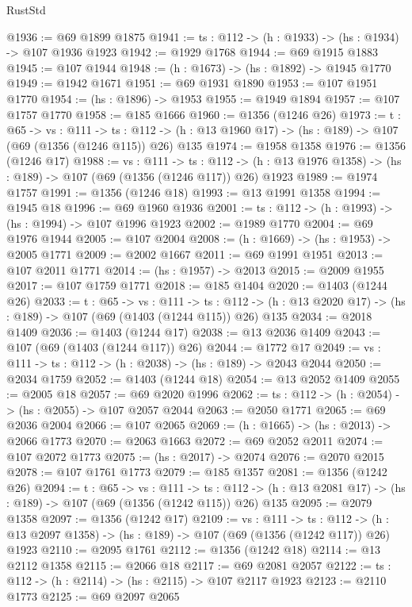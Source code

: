 \begin{lexlean}{RustStd}
\begin{coremodule}
@1936 := @69 @1899 @1875
@1941 := {ts : @112} -> (h : @1933) -> (hs : @1934) -> @107 @1936 @1923
@1942 := @1929 @1768
@1944 := @69 @1915 @1883
@1945 := @107 @1944
@1948 := (h : @1673) -> (hs : @1892) -> @1945 @1770
@1949 := @1942 @1671
@1951 := @69 @1931 @1890
@1953 := @107 @1951 @1770
@1954 := (hs : @1896) -> @1953
@1955 := @1949 @1894
@1957 := @107 @1757 @1770
@1958 := @185 @1666
@1960 := @1356 (@1246 @26)
@1973 := {t : @65} ->
  {vs : @111} ->
  {ts : @112} -> (h : @13 @1960 @17) -> (hs : @189) -> @107 (@69 (@1356 (@1246 @115)) @26) @135
@1974 := @1958 @1358
@1976 := @1356 (@1246 @17)
@1988 := {vs : @111} ->
  {ts : @112} -> (h : @13 @1976 @1358) -> (hs : @189) -> @107 (@69 (@1356 (@1246 @117)) @26) @1923
@1989 := @1974 @1757
@1991 := @1356 (@1246 @18)
@1993 := @13 @1991 @1358
@1994 := @1945 @18
@1996 := @69 @1960 @1936
@2001 := {ts : @112} -> (h : @1993) -> (hs : @1994) -> @107 @1996 @1923
@2002 := @1989 @1770
@2004 := @69 @1976 @1944
@2005 := @107 @2004
@2008 := (h : @1669) -> (hs : @1953) -> @2005 @1771
@2009 := @2002 @1667
@2011 := @69 @1991 @1951
@2013 := @107 @2011 @1771
@2014 := (hs : @1957) -> @2013
@2015 := @2009 @1955
@2017 := @107 @1759 @1771
@2018 := @185 @1404
@2020 := @1403 (@1244 @26)
@2033 := {t : @65} ->
  {vs : @111} ->
  {ts : @112} -> (h : @13 @2020 @17) -> (hs : @189) -> @107 (@69 (@1403 (@1244 @115)) @26) @135
@2034 := @2018 @1409
@2036 := @1403 (@1244 @17)
@2038 := @13 @2036 @1409
@2043 := @107 (@69 (@1403 (@1244 @117)) @26)
@2044 := @1772 @17
@2049 := {vs : @111} -> {ts : @112} -> (h : @2038) -> (hs : @189) -> @2043 @2044
@2050 := @2034 @1759
@2052 := @1403 (@1244 @18)
@2054 := @13 @2052 @1409
@2055 := @2005 @18
@2057 := @69 @2020 @1996
@2062 := {ts : @112} -> (h : @2054) -> (hs : @2055) -> @107 @2057 @2044
@2063 := @2050 @1771
@2065 := @69 @2036 @2004
@2066 := @107 @2065
@2069 := (h : @1665) -> (hs : @2013) -> @2066 @1773
@2070 := @2063 @1663
@2072 := @69 @2052 @2011
@2074 := @107 @2072 @1773
@2075 := (hs : @2017) -> @2074
@2076 := @2070 @2015
@2078 := @107 @1761 @1773
@2079 := @185 @1357
@2081 := @1356 (@1242 @26)
@2094 := {t : @65} ->
  {vs : @111} ->
  {ts : @112} -> (h : @13 @2081 @17) -> (hs : @189) -> @107 (@69 (@1356 (@1242 @115)) @26) @135
@2095 := @2079 @1358
@2097 := @1356 (@1242 @17)
@2109 := {vs : @111} ->
  {ts : @112} -> (h : @13 @2097 @1358) -> (hs : @189) -> @107 (@69 (@1356 (@1242 @117)) @26) @1923
@2110 := @2095 @1761
@2112 := @1356 (@1242 @18)
@2114 := @13 @2112 @1358
@2115 := @2066 @18
@2117 := @69 @2081 @2057
@2122 := {ts : @112} -> (h : @2114) -> (hs : @2115) -> @107 @2117 @1923
@2123 := @2110 @1773
@2125 := @69 @2097 @2065

\end{coremodule}
\end{lexlean}
